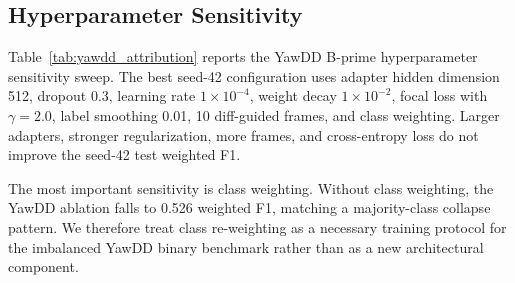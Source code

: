 \subsection{Hyperparameter Sensitivity}
\label{sec:hyperparameter_sensitivity}

Table~\ref{tab:yawdd_attribution} reports the YawDD B-prime hyperparameter sensitivity sweep. The best seed-42 configuration uses adapter hidden dimension 512, dropout 0.3, learning rate $1\times10^{-4}$, weight decay $1\times10^{-2}$, focal loss with $\gamma=2.0$, label smoothing 0.01, 10 diff-guided frames, and class weighting. Larger adapters, stronger regularization, more frames, and cross-entropy loss do not improve the seed-42 test weighted F1.

The most important sensitivity is class weighting. Without class weighting, the YawDD ablation falls to 0.526 weighted F1, matching a majority-class collapse pattern. We therefore treat class re-weighting as a necessary training protocol for the imbalanced YawDD binary benchmark rather than as a new architectural component.
